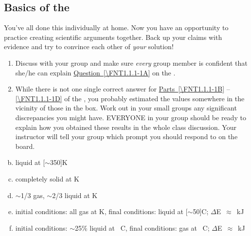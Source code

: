 \subsection{Basics of the \ThreePhaseModel{}}

\begin{FNTenv}
	
\end{FNTenv}

\noindent
You've all done this \FNT{} individually at home. Now you have an opportunity to practice creating scientific arguments together. Back up your claims with evidence and try to convince each other of \emph{your} solution!

\begin{enumerate}
	\item Discuss with your group and make sure \emph{every} group member is confident that she/he can explain \hyperref[\FNT1.1.1-1A]{Question~\ref*{\FNT1.1.1-1A}} on the \FNT{}.
	
	\item While there is not one single correct answer for \hyperref[\FNT1.1.1-1B]{Parts~\ref*{\FNT1.1.1-1B}} -- \hyperref[\FNT1.1.1-1D]{\ref*{\FNT1.1.1-1D}} of the \FNT{}, you probably estimated the values somewhere in the vicinity of those in the box. Work out in your small groups any significant discrepancies you might have. EVERYONE in your group should be ready to explain how you obtained these results in the whole class discussion. Your instructor will tell your group which prompt you should respond to on the board.
\end{enumerate}

\begin{ans}
	\begin{enumerate}[(a)]
	  \setcounter{enumi}{1}
		\item liquid at \unit[$\sim$350]{K}
		\item completely solid at \unit[273]{K}
		\item $\sim$1/3 gas, $\sim$2/3 liquid at \unit[373]{K}
		\item initial conditions: all gas at \unit[373]{K}, final conditions: liquid at \unit[$\sim$50]{\textdegree C}; $\Delta$E~$\approx$~\unit[2470]{kJ}
		\item initial conditions: $\sim$25\% liquid at \unit[0]{\textdegree C}, final conditions: gas at \unit[100]{\textdegree C}; $\Delta$E~$\approx$~\unit[3000]{kJ}
	\end{enumerate}
\end{ans}



